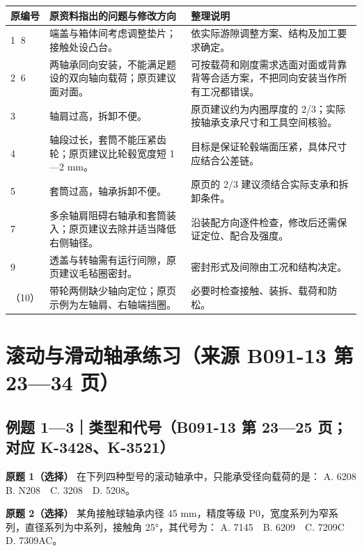 \documentclass[zihao=5,a4paper,UTF8,fontset=fandol]{ctexart}
\begin{document}
\begin{longtable}{p{4.86cm}p{4.86cm}p{4.86cm}}
\toprule
原编号 & 原资料指出的问题与修改方向 & 整理说明 \\

\midrule
\endhead
\textcircled{1}、\textcircled{8} & 端盖与箱体间考虑调整垫片；接触处设凸台。 & 依实际游隙调整方案、结构及加工要求确定。 \\
\textcircled{2}、\textcircled{6} & 两轴承同向安装，不能满足题设的双向轴向载荷；原页建议面对面。 & 可按载荷和刚度需求选面对面或背靠背等合适方案，不把同向安装当作所有工况都错误。 \\
\textcircled{3} & 轴肩过高，拆卸不便。 & 原页建议约为内圈厚度的 2/3；实际按轴承支承尺寸和工具空间核验。 \\
\textcircled{4} & 轴段过长，套筒不能压紧齿轮；原页建议比轮毂宽度短 1—2 mm。 & 目标是保证轮毂端面压紧，具体尺寸应结合公差链。 \\
\textcircled{5} & 套筒过高，轴承拆卸不便。 & 原页的 2/3 建议须结合实际支承和拆卸条件。 \\
\textcircled{7} & 多余轴肩阻碍右轴承和套筒装入；原页建议去除并适当降低右侧轴径。 & 沿装配方向逐件检查，修改后还需保证定位、配合及强度。 \\
\textcircled{9} & 透盖与转轴需有运行间隙，原页建议毛毡圈密封。 & 密封形式及间隙由工况和结构决定。 \\
（10） & 带轮两侧缺少轴向定位；原页示例为左轴肩、右轴端挡圈。 & 必要时检查接触、装拆、载荷和防松。 \\
\bottomrule
\end{longtable}



\section{滚动与滑动轴承练习（来源 B091-13 第 23—34 页）}

\subsection{例题 1—3｜类型和代号（B091-13 第 23—25 页；对应 K-3428、K-3521）}

\textbf{原题 1（选择）} 在下列四种型号的滚动轴承中，只能承受径向载荷的是：
A. 6208　B. N208　C. 3208　D. 5208。


\textbf{原题 2（选择）} 某角接触球轴承内径 45 mm，精度等级 P0，宽度系列为窄系列，直径系列为中系列，接触角 25°，其代号为：
A. 7145　B. 6209　C. 7209C　D. 7309AC。
\end{document}
